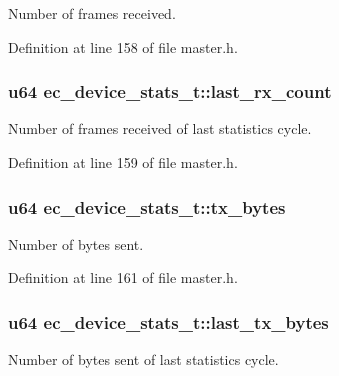 \-Number of frames received. 



\-Definition at line 158 of file master.\-h.

\subsubsection[{last\-\_\-rx\-\_\-count}]{\setlength{\rightskip}{0pt plus 5cm}u64 {\bf ec\-\_\-device\-\_\-stats\-\_\-t\-::last\-\_\-rx\-\_\-count}}\label{structec__device__stats__t_af7e4fc7bfa8d67523c5e4f49b3953280}


\-Number of frames received of last statistics cycle. 



\-Definition at line 159 of file master.\-h.

\subsubsection[{tx\-\_\-bytes}]{\setlength{\rightskip}{0pt plus 5cm}u64 {\bf ec\-\_\-device\-\_\-stats\-\_\-t\-::tx\-\_\-bytes}}\label{structec__device__stats__t_ac4bcb52ad4f765671ffe124f4019b370}


\-Number of bytes sent. 



\-Definition at line 161 of file master.\-h.

\subsubsection[{last\-\_\-tx\-\_\-bytes}]{\setlength{\rightskip}{0pt plus 5cm}u64 {\bf ec\-\_\-device\-\_\-stats\-\_\-t\-::last\-\_\-tx\-\_\-bytes}}\label{structec__device__stats__t_ab4d135010f4b8200a252f02429bd4160}


\-Number of bytes sent of last statistics cycle. 



